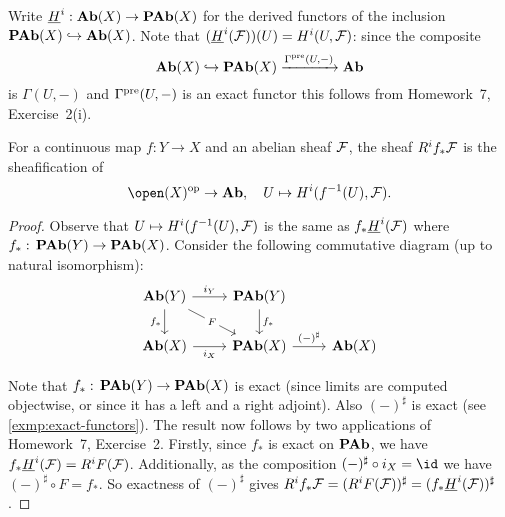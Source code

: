 \documentclass[../main.tex]{subfiles}
\begin{document}
\begin{defn}
    Write $\underline{H}^i\colon \catAbelianGroup(X) \to \catAbelianPresheaf(X)$ for the derived functors of the inclusion $\operatorname{\mathbf{PAb}}(X) \hookrightarrow \mathbf{Ab}(X)$. Note that $(\underline{H}^i(\mathcal{F}))(U) = H^i(U, \mathcal{F})$: since the composite
    \[\mathbf{Ab}(X) \hookrightarrow \operatorname{\mathbf{PAb}}(X) \xrightarrow{\Gamma^{\smash{\textup{pre}}}(U, -)} \mathbf{Ab}\] is $\Gamma(U, -)$ and $\Gamma^{\smash{\textup{pre}}}(U, -)$ is an exact functor this follows from Homework~7, Exercise~2(i).
\end{defn}

\begin{lem}
    For a continuous map $f\colon Y \to X$ and an abelian sheaf $\mathcal{F}$, the sheaf $R^i f_* \mathcal{F}$ is the sheafification of \[\open(X)\opp \to \catAbelianGroup,\quad U \mapsto H^i(f^{-1}(U), \sh F).\]
\end{lem}
\begin{proof}
    Observe that $U\mapsto H^i(f^{-1}(U), \mathcal{F})$ is the same as $f_* \underline{H}^i(\mathcal{F})$ where $f_* \colon \catAbelianPresheaf(Y) \to \catAbelianPresheaf(X)$. Consider the following commutative diagram (up to natural isomorphism):
\[\begin{tikzcd}
	{\catAbelianGroup(Y)} & {\catAbelianPresheaf(Y)} \\
	{\catAbelianGroup(X)} & {\catAbelianPresheaf(X)} & {\catAbelianGroup(X)}
	\arrow["{i_Y}", from=1-1, to=1-2]
	\arrow["{f_*}"', from=1-1, to=2-1]
	\arrow["F"{description}, from=1-1, to=2-2]
	\arrow["{f_*}", from=1-2, to=2-2]
	\arrow["{i_X}"', from=2-1, to=2-2]
	\arrow["{(-)^\sharp}", from=2-2, to=2-3]
\end{tikzcd}\]

    Note that $f_*\colon \catAbelianPresheaf(Y) \to \catAbelianPresheaf(X)$ is exact (since limits are computed objectwise, or since it has a left and a right adjoint). Also $(-)^\sharp$ is exact (see \cref{exmp:exact-functors}). The result now follows by two applications of Homework~7, Exercise~2. Firstly, since $f_*$ is exact on $\operatorname{\mathbf{PAb}}$, we have $f_* \underline{H}^i(\mathcal{F}) = R^i F(\mathcal{F})$. Additionally, as the composition $(-)^\sharp \circ i_X = \id$ we have $(-)^\sharp \circ F = f_*$. So exactness of $(-)^\sharp$ gives $R^i f_* \mathcal{F} = (R^i F(\mathcal{F}))^\sharp = (f_* \underline{H}^i(\mathcal{F}))^\sharp$.
\end{proof}
\end{document}
